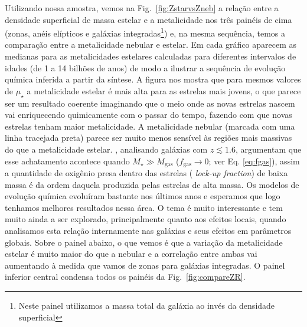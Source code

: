 Utilizando nossa amostra, vemos na Fig.\ \ref{fig:ZstarvsZneb} a relação entre a densidade
superficial de massa estelar e a metalicidade nos três painéis de cima (zonas, anéis elípticos e
galáxias integradas\footnote{Neste painel utilizamos a massa total da galáxia ao invés da densidade
superficial}) e, na mesma sequência, temos a comparação entre a metalicidade nebular e estelar. Em
cada gráfico aparecem as medianas para as metalicidades estelares calculadas para diferentes
intervalos de idades (de 1 a 14 bilhões de anos) de modo a ilustrar a sequência de evolução química
inferida a partir da síntese. A figura nos mostra que para mesmos valores de $\mu_\star$ a
metalicidade estelar é mais alta para as estrelas mais jovens, o que parece ser um resultado
coerente imaginando que o meio onde as novas estrelas nascem vai enriquecendo quimicamente com o
passar do tempo, fazendo com que novas estrelas tenham maior metalicidade. A metalicidade nebular
(marcada com uma linha tracejada preta) parece ser muito menos sensível às regiões mais massivas do
que a metalicidade estelar. \citet{Zahid.etal.2014a}, analisando galáxias com $z \lesssim 1.6$,
argumentam que esse achatamento acontece quando $M_\star \gg M_{\mathrm{gas}}$ ($f_{\mathrm{gas}}
\to 0$; ver Eq. \ref{eq:fgas}), assim a quantidade de oxigênio presa dentro das estrelas ({\em
lock-up fraction}) de baixa massa é da ordem daquela produzida pelas estrelas de alta massa. Os
modelos de evolução química evoluíram bastante nos últimos anos \citep[e.g., ][]{Lilly.etal.2013a,
Peng.Maiolino.2014a, Ascasibar.etal.2015a, Peng.Maiolino.Cochrane.2015a} e esperamos que logo
tenhamos melhores resultados nessa área. O tema é muito interessante e tem muito ainda a ser
explorado, principalmente quanto aos efeitos locais, quando analisamos esta relação internamente nas
galáxias e seus efeitos em parâmetros globais. Sobre o painel abaixo, o que vemos é que a variação
da metalicidade estelar é muito maior do que a nebular e a correlação entre ambas vai aumentando à
medida que vamos de zonas para galáxias integradas. O painel inferior central condensa todos os
painéis da Fig.\ \ref{fig:compareZR}.

